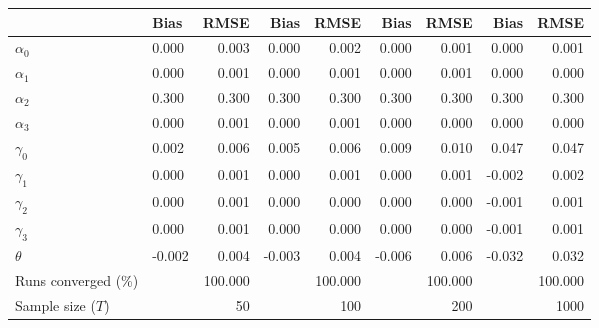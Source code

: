 
\begin{tabular}[t]{llrrrrrrr}
\toprule
  & Bias & RMSE & Bias & RMSE & Bias & RMSE & Bias & RMSE\\
\midrule
$\alpha_{0}$ & 0.000 & 0.003 & 0.000 & 0.002 & 0.000 & 0.001 & 0.000 & 0.001\\
$\alpha_{1}$ & 0.000 & 0.001 & 0.000 & 0.001 & 0.000 & 0.001 & 0.000 & 0.000\\
$\alpha_{2}$ & 0.300 & 0.300 & 0.300 & 0.300 & 0.300 & 0.300 & 0.300 & 0.300\\
$\alpha_{3}$ & 0.000 & 0.001 & 0.000 & 0.001 & 0.000 & 0.000 & 0.000 & 0.000\\
$\gamma_{0}$ & 0.002 & 0.006 & 0.005 & 0.006 & 0.009 & 0.010 & 0.047 & 0.047\\
$\gamma_{1}$ & 0.000 & 0.001 & 0.000 & 0.001 & 0.000 & 0.001 & -0.002 & 0.002\\
$\gamma_{2}$ & 0.000 & 0.001 & 0.000 & 0.000 & 0.000 & 0.000 & -0.001 & 0.001\\
$\gamma_{3}$ & 0.000 & 0.001 & 0.000 & 0.000 & 0.000 & 0.000 & -0.001 & 0.001\\
$\theta$ & -0.002 & 0.004 & -0.003 & 0.004 & -0.006 & 0.006 & -0.032 & 0.032\\
Runs converged (\%) &  & 100.000 &  & 100.000 &  & 100.000 &  & 100.000\\
Sample size ($T$) &  & 50 &  & 100 &  & 200 &  & 1000\\
\bottomrule
\end{tabular}
